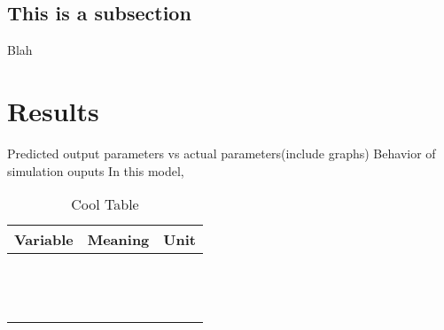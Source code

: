 \documentclass{article}
\newcommand{\D}{\displaystyle}
\begin{document}
\subsection{This is a subsection}
Blah
\hfill\break

\hfill\break

\section{Results}
Predicted output parameters vs actual parameters(include graphs)\hfill\break
Behavior of simulation ouputs\hfill\break
\hfill\break
\hfill\break
In this model,
\hfill\break
\begin{table}
\caption{Cool Table} 
\centering 
\begin{tabular}{lll}
\hline
Variable  & Meaning &Unit\\ [0.5ex]
\hline
\\
&  &  $\D\frac{\mbox{}}{}$ \\ [0.5ex]	
&  &  $\D\frac{\mbox{}}{}$ \\ [0.5ex]
& &$\D\frac{\mbox{}}{}$ \\[0.5ex]
& &  $\D\frac{\mbox{}}{}$  \\ [0.5ex]

\hline
\end{tabular}
\label{table:variables} 
\end{table}
\hfill\break
\end{document}
